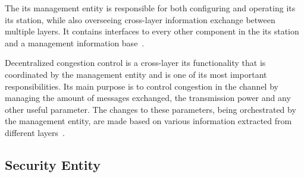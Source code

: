 The \gls{its} management entity is responsible for both configuring and operating its \gls{its} station, while also overseeing cross-layer information exchange between multiple layers. It contains interfaces to every other component in the \gls{its} station and a management information base~\cite{etsi_intelligent_2014}. 

Decentralized congestion control is a cross-layer \gls{its} functionality that is coordinated by the management entity and is one of its most important responsibilities. Its main purpose is to control congestion in the channel by managing the amount of messages exchanged, the transmission power and any other useful parameter. The changes to these parameters, being orchestrated by the management entity, are made based on various information extracted from different layers~\cite{festag_cooperative_2014}.



\subsection[Security Entity]{Security Entity}

